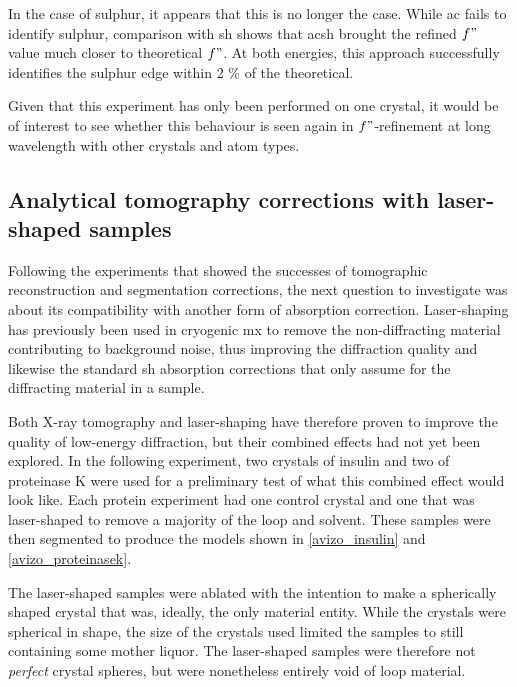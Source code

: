 In the case of sulphur, it appears that this is no longer the case. While \ac{ac} fails to identify sulphur, comparison with \ac{sh} shows that \ac{acsh} brought the refined $f"$ value much closer to theoretical $f"$. At both energies, this approach successfully identifies the sulphur edge within 2 \% of the theoretical.%

Given that this experiment has only been performed on one crystal, it would be of interest to see whether this behaviour is seen again in $f"$-refinement at long wavelength with other crystals and atom types. %

\subsection{Analytical tomography corrections with laser-shaped samples}

Following the experiments that showed the successes of tomographic reconstruction and segmentation corrections, the next question to investigate was about its compatibility with another form of absorption correction. Laser-shaping has previously been used in cryogenic \ac{mx} to remove the non-diffracting material contributing to background noise, thus improving the diffraction quality and likewise the standard \ac{sh} absorption corrections that only assume for the diffracting material in a sample.

Both X-ray tomography and laser-shaping have therefore proven to improve the quality of low-energy diffraction, but their combined effects had not yet been explored. In the following experiment, two crystals of insulin and two of proteinase K were used for a preliminary test of what this combined effect would look like. Each protein experiment had one control crystal and one that was laser-shaped to remove a majority of the loop and solvent. These samples were then segmented to produce the models shown in \cref{avizo_insulin} and \cref{avizo_proteinasek}.

The laser-shaped samples were ablated with the intention to make a spherically shaped crystal that was, ideally, the only material entity. While the crystals were spherical in shape, the size of the crystals used limited the samples to still containing some mother liquor. The laser-shaped samples were therefore not \textit{perfect} crystal spheres, but were nonetheless entirely void of loop material.

